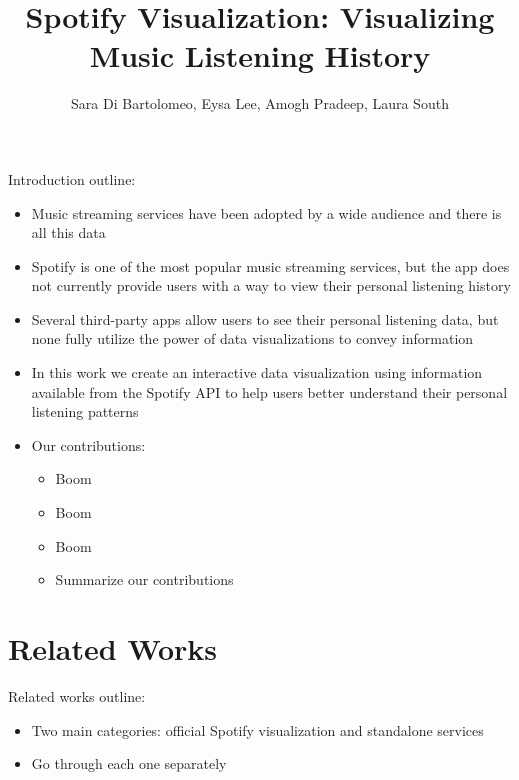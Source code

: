 \documentclass[journal]{vgtc}                %
\title{Spotify Visualization: Visualizing Music Listening History}
\author{Sara Di Bartolomeo, Eysa Lee, Amogh Pradeep, Laura South}
\begin{document}


\maketitle

Introduction outline:
\begin{itemize}
  \item Music streaming services have been adopted by a wide audience and there is all this data

  \item Spotify is one of the most popular music streaming services, but the app does not currently provide users with a way to view their personal listening history
  
  \item Several third-party apps allow users to see their personal listening data, but none fully utilize the power of data visualizations to convey information

  \item In this work we create an interactive data visualization using information available from the Spotify API to help users better understand their personal listening patterns
  
  \item Our contributions:
  \begin{itemize}
    \item Boom
    \item Boom
    \item Boom
    \item Summarize our contributions
  \end{itemize}
\end{itemize}

\section{Related Works}
Related works outline:
\begin{itemize}
  \item Two main categories: official Spotify visualization and standalone services
  \item Go through each one separately
\end{itemize}
\end{document}

